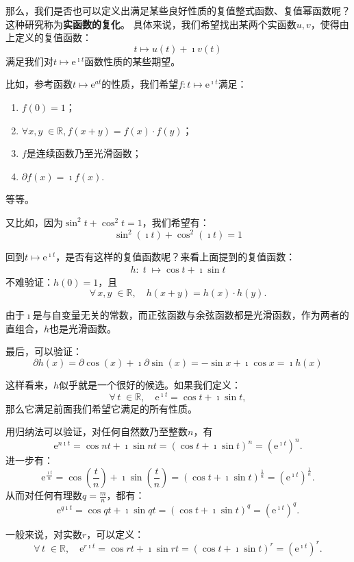 \documentclass[12pt,UTF8]{ctexbook}
\newcommand{\e}{\mathrm{e}}
\theoremstyle{definition}
\theoremstyle{plain}
\begin{document}
那么，我们是否也可以定义出满足某些良好性质的复值整式函数、复值幂函数呢？这种研究称为\textbf{实函数的复化}。
具体来说，我们希望找出某两个实函数$u,v$，使得由上定义的复值函数：
$$ t\mapsto u(t) + \imath v(t)$$
满足我们对$t\mapsto \e^{\imath t}$函数性质的某些期望。

比如，参考函数$t\mapsto \e^{at}$的性质，我们希望$f: t\mapsto \e^{\imath t}$满足：
\begin{enumerate}
    \item $f(0) = 1$；
    \item $\forall x, y \; \in \mathbb{R}, f(x + y) = f(x)\cdot f(y)$；
    \item $f$是连续函数乃至光滑函数；
    \item $\partial f(x) = \imath f(x).$
\end{enumerate}
等等。

又比如，因为$\sin^2{t} + \cos^2{t} = 1$，我们希望有：
$$ \sin^2{(\imath t)} + \cos^2{(\imath t)} = 1 $$

回到$t\mapsto \e^{\imath t}$，是否有这样的复值函数呢？来看上面提到的复值函数：
\begin{align*}
    h: \;t \;\mapsto \cos{t} + \imath \sin{t}
\end{align*}
不难验证：$h(0) = 1$，且
$$ \forall \, x, y\; \in \mathbb{R}, \quad h(x + y) = h(x)\cdot h(y).$$

由于$\imath$是与自变量无关的常数，而正弦函数与余弦函数都是光滑函数，作为两者的直组合，$h$也是光滑函数。

最后，可以验证：
$$ \partial h(x) = \partial \cos{(x)} + \imath \partial \sin{(x)} = - \sin{x} + \imath \cos{x} = \imath h(x) $$

这样看来，$h$似乎就是一个很好的候选。如果我们定义：
$$ \forall \, t \; \in \mathbb{R}, \quad  \e^{\imath t} = \cos{t} + \imath \sin{t}, $$
那么它满足前面我们希望它满足的所有性质。

用归纳法可以验证，对任何自然数乃至整数$n$，有
$$ \e^{n\imath t} = \cos{nt} + \imath \sin{nt} = (\cos{t} + \imath \sin{t})^n = \left( \e^{\imath t} \right)^n. $$
进一步有：
$$ \e^{\frac{\imath t}{n}} = \cos{\left(\frac{t}{n}\right)} + \imath \sin{\left(\frac{t}{n}\right)} = (\cos{t} + \imath \sin{t})^{\frac{1}{n}} = \left( \e^{\imath t} \right)^{\frac{1}{n}}. $$
从而对任何有理数$q = \frac{m}{n}$，都有：
$$ \e^{q\imath t} = \cos{qt} + \imath \sin{qt} = (\cos{t} + \imath \sin{t})^q = \left( \e^{\imath t} \right)^q. $$

一般来说，对实数$r$，可以定义：
$$ \forall \, t \; \in \mathbb{R}, \quad \e^{r\imath t} = \cos{rt} + \imath \sin{rt} = (\cos{t} + \imath \sin{t})^r = \left( \e^{\imath t} \right)^r. $$
\end{document}

